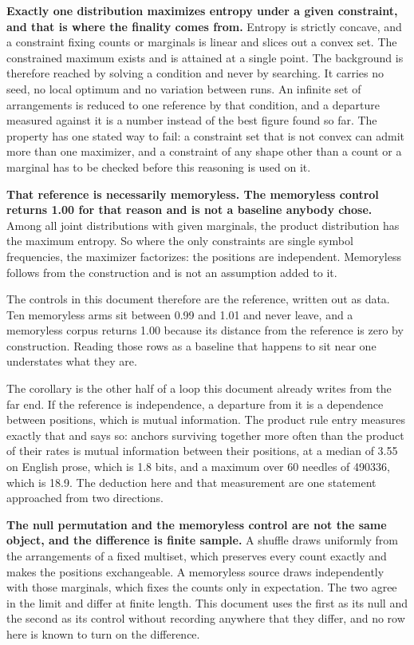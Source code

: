 \textbf{Exactly one distribution maximizes entropy under a given constraint, and that is where the finality comes from.} Entropy is strictly concave, and a constraint fixing counts or marginals is linear and slices out a convex set. The constrained maximum exists and is attained at a single point. The background is therefore reached by solving a condition and never by searching. It carries no seed, no local optimum and no variation between runs. An infinite set of arrangements is reduced to one reference by that condition, and a departure measured against it is a number instead of the best figure found so far. The property has one stated way to fail: a constraint set that is not convex can admit more than one maximizer, and a constraint of any shape other than a count or a marginal has to be checked before this reasoning is used on it.

\textbf{That reference is necessarily memoryless. The memoryless control returns 1.00 for that reason and is not a baseline anybody chose.} Among all joint distributions with given marginals, the product distribution has the maximum entropy. So where the only constraints are single symbol frequencies, the maximizer factorizes: the positions are independent. Memoryless follows from the construction and is not an assumption added to it.

The controls in this document therefore are the reference, written out as data. Ten memoryless arms sit between 0.99 and 1.01 and never leave, and a memoryless corpus returns 1.00 because its distance from the reference is zero by construction. Reading those rows as a baseline that happens to sit near one understates what they are.

The corollary is the other half of a loop this document already writes from the far end. If the reference is independence, a departure from it is a dependence between positions, which is mutual information. The product rule entry measures exactly that and says so: anchors surviving together more often than the product of their rates is mutual information between their positions, at a median of 3.55 on English prose, which is 1.8 bits, and a maximum over 60 needles of 490336, which is 18.9. The deduction here and that measurement are one statement approached from two directions.

\textbf{The null permutation and the memoryless control are not the same object, and the difference is finite sample.} A shuffle draws uniformly from the arrangements of a fixed multiset, which preserves every count exactly and makes the positions exchangeable. A memoryless source draws independently with those marginals, which fixes the counts only in expectation. The two agree in the limit and differ at finite length. This document uses the first as its null and the second as its control without recording anywhere that they differ, and no row here is known to turn on the difference.

